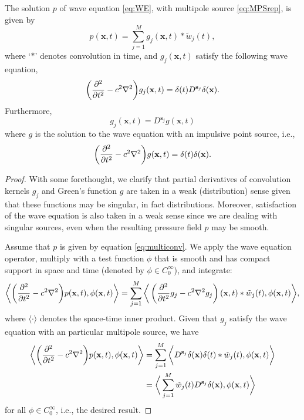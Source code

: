 \begin{theorem}\label{thm:MPSsol}
	The solution $p$ of wave equation \ref{eq:WE}, with multipole source \ref{eq:MPSrep}, is given by
	\begin{equation}\label{eq:multiconv}
		p(\mathbf x,t) = \sum_{j=1}^M g_j(\mathbf x,t) * \tilde w_j(t),
	\end{equation}
	where `$*$' denotes convolution in time, and $g_j(\mathbf x,t)$ satisfy the following wave equation,
	\[
		\bigg(\frac{\partial^2}{\partial t^2} - c^2\nabla^2 \bigg) g_j(\mathbf x,t) = \delta(t) D^{\mathbf s_j}\delta(\mathbf x).
	\]
	Furthermore, 
	\[
		g_j(\mathbf x,t) = D^{\mathbf s_j} g(\mathbf x,t)
	\]
	where $g$ is the solution to the wave equation with an impulsive point source, i.e.,
	\[
		\bigg(\frac{\partial^2}{\partial t^2} - c^2\nabla^2 \bigg) g(\mathbf x,t) = \delta(t) \delta(\mathbf x).
	\]
\end{theorem}
\begin{proof}
	With some forethought, we clarify that partial derivatives of convolution kernels $g_j$ and Green's function $g$ are taken in a weak (distribution) sense given that these functions may be singular, in fact distributions.
	Moreover, satisfaction of the wave equation is also taken in a weak sense since we are dealing with singular sources, even when the resulting pressure field $p$ may be smooth.
	
	Assume that $p$ is given by equation \ref{eq:multiconv}.
	We apply the wave equation operator, multiply with a test function $\phi$ that is smooth and has compact support in space and time (denoted by $\phi\in C_0^\infty$), and integrate:
	\[
		\bigg\langle \bigg(\frac{\partial^2}{\partial t^2} - c^2\nabla^2 \bigg) p(\mathbf x,t),\phi(\mathbf x,t) \bigg\rangle 
		= \sum_{j=1}^M \bigg\langle  \left(\frac{\partial^2}{\partial t^2}g_j - c^2\nabla^2g_j\right)(\mathbf x,t)*\tilde w_j(t), \phi(\mathbf x,t) \bigg\rangle,
	\]
	where $\langle \cdot\rangle$ denotes the space-time inner product.
	Given that $g_j$ satisfy the wave equation with an particular multipole source, we have
\begin{equation*}
\begin{split}		
	\bigg\langle\bigg(\frac{\partial^2}{\partial t^2} - c^2\nabla^2 \bigg) p(\mathbf x,t),\phi(\mathbf x,t) \bigg\rangle
		&= \sum_{j=1}^M \bigg\langle D^{\mathbf s_j}\delta(\mathbf x)\delta(t)*\tilde w_j(t), \phi(\mathbf x,t) \bigg\rangle \\
		&= \bigg\langle \sum_{j=1}^M \tilde w_j(t) D^{\mathbf s_j}\delta(\mathbf x), \phi(\mathbf x,t) \bigg\rangle
\end{split}
\end{equation*}
for all $\phi \in C_0^\infty$, i.e., the desired result.


\end{proof}
